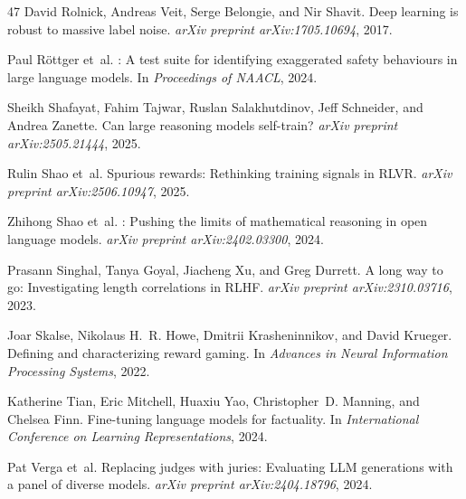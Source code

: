 \documentclass[11pt,a4paper,twocolumn]{article}
\begin{document}
\begin{thebibliography}{47}
David Rolnick, Andreas Veit, Serge Belongie, and Nir Shavit.
\newblock Deep learning is robust to massive label noise.
\newblock \emph{arXiv preprint arXiv:1705.10694}, 2017.

Paul R{\"o}ttger et~al.
: A test suite for identifying exaggerated safety behaviours
  in large language models.
\newblock In \emph{Proceedings of NAACL}, 2024.

Sheikh Shafayat, Fahim Tajwar, Ruslan Salakhutdinov, Jeff Schneider, and Andrea
  Zanette.
\newblock Can large reasoning models self-train?
\newblock \emph{arXiv preprint arXiv:2505.21444}, 2025.

Rulin Shao et~al.
\newblock Spurious rewards: Rethinking training signals in {RLVR}.
\newblock \emph{arXiv preprint arXiv:2506.10947}, 2025.

Zhihong Shao et~al.
: Pushing the limits of mathematical reasoning in open
  language models.
\newblock \emph{arXiv preprint arXiv:2402.03300}, 2024.

Prasann Singhal, Tanya Goyal, Jiacheng Xu, and Greg Durrett.
\newblock A long way to go: Investigating length correlations in {RLHF}.
\newblock \emph{arXiv preprint arXiv:2310.03716}, 2023.

Joar Skalse, Nikolaus H.~R. Howe, Dmitrii Krasheninnikov, and David Krueger.
\newblock Defining and characterizing reward gaming.
\newblock In \emph{Advances in Neural Information Processing Systems}, 2022.

Katherine Tian, Eric Mitchell, Huaxiu Yao, Christopher~D. Manning, and Chelsea
  Finn.
\newblock Fine-tuning language models for factuality.
\newblock In \emph{International Conference on Learning Representations}, 2024.

Pat Verga et~al.
\newblock Replacing judges with juries: Evaluating {LLM} generations with a
  panel of diverse models.
\newblock \emph{arXiv preprint arXiv:2404.18796}, 2024.


\end{thebibliography}
\end{document}
